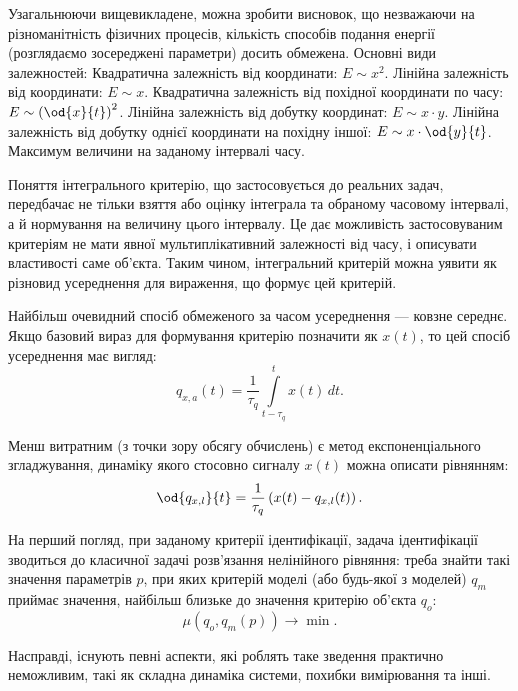 \documentclass[a4paper,13pt]{atuaref}
\begin{document}
Узагальнюючи вищевикладене, можна зробити висновок, що незважаючи на
різноманітність фізичних процесів, кількість способів подання енергії
(розглядаємо зосереджені параметри) досить обмежена. Основні види залежностей:
  Квадратична залежність від координати:
    $E \sim x^2$.
  Лінійна залежність від координати:
    $E \sim x$.
  Квадратична залежність від похідної координати по часу:
    $E \sim \left( \od{x}{t}\right)^2$.
  Лінійна залежність від добутку координат:
    $E \sim x \cdot y$.
    Лінійна залежність від добутку однієї координати на похідну іншої:
     $E \sim x \cdot \od{y}{t}$.
  Максимум величини на заданому інтервалі часу.

Поняття інтегрального критерію, що застосовується до реальних задач, передбачає
не тільки взяття або оцінку інтеграла та обраному часовому
інтервалі, а й нормування на величину цього інтервалу. Це дає можливість
застосовуваним критеріям не мати явної мультиплікативний залежності від часу, і
описувати властивості саме об'єкта. Таким чином, інтегральний критерій можна
уявити як різновид усереднення для вираження, що формує цей критерій.

Найбільш очевидний спосіб обмеженого за часом усереднення --- ковзне середнє.
Якщо базовий вираз для формування критерію позначити як
$x(t)$, то цей спосіб усереднення має вигляд:
%
\begin{equation}
  q_{x,a}(t) =
  \frac{1}{\tau_q}
  \int\limits_{t-\tau_q}^{t} x(t) \, dt.
  \label{atu:eq:moving_avarage}
\end{equation}

Менш витратним (з точки зору обсягу обчислень) є метод експоненціального
згладжування, динаміку якого стосовно сигналу $x(t)$ можна описати
рівнянням:
%
\begin{equation}
\od{q_{x,l}}{t}
=
\frac{1}{\tau_q} \left( x(t) - q_{x,l}(t) \right) .
\label{atu:eq:qlin}
\end{equation}

На перший погляд, при заданому критерії ідентифікації, задача ідентифікації
зводиться до класичної задачі розв'язання нелінійного рівняння: треба знайти
такі значення параметрів $p$, при яких критерій моделі (або будь-якої з
моделей) $q_m$ приймає значення, найбільш близьке до значення критерію
об'єкта $q_o$:
\[
  \mu( q_o, q_m(p) ) \to \min.
\]

Насправді, існують певні аспекти, які роблять таке зведення практично
неможливим, такі як складна динаміка системи, похибки вимірювання та інші.

\end{document}
